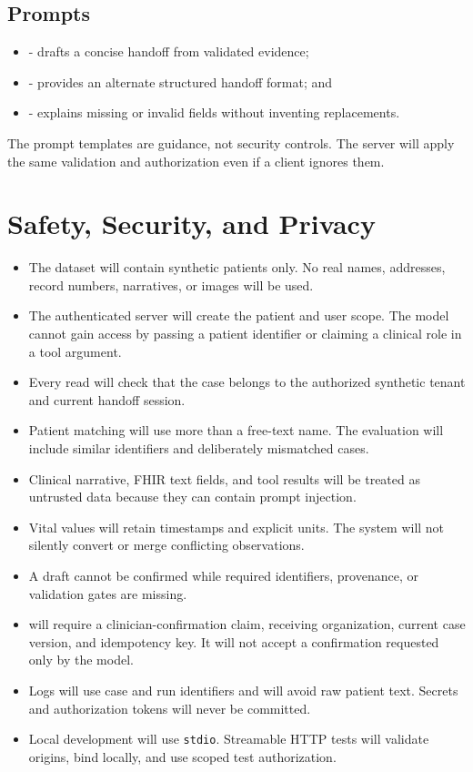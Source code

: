 \documentclass[10pt]{article}
\newcommand{\term}[1]{\texttt{#1}}
\begin{document}
\subsection{Prompts}

\begin{itemize}
  \item {} - drafts a concise handoff from validated evidence;
  \item {} - provides an alternate structured handoff format; and
  \item {} - explains missing or invalid fields without inventing replacements.
\end{itemize}

The prompt templates are guidance, not security controls. The server will apply the same validation and authorization even if a client ignores them.

\section{Safety, Security, and Privacy}

\begin{itemize}
  \item The dataset will contain synthetic patients only. No real names, addresses, record numbers, narratives, or images will be used.
  \item The authenticated server will create the patient and user scope. The model cannot gain access by passing a patient identifier or claiming a clinical role in a tool argument.
  \item Every read will check that the case belongs to the authorized synthetic tenant and current handoff session.
  \item Patient matching will use more than a free-text name. The evaluation will include similar identifiers and deliberately mismatched cases.
  \item Clinical narrative, FHIR text fields, and tool results will be treated as untrusted data because they can contain prompt injection.
  \item Vital values will retain timestamps and explicit units. The system will not silently convert or merge conflicting observations.
  \item A draft cannot be confirmed while required identifiers, provenance, or validation gates are missing.
  \item {} will require a clinician-confirmation claim, receiving organization, current case version, and idempotency key. It will not accept a confirmation requested only by the model.
  \item Logs will use case and run identifiers and will avoid raw patient text. Secrets and authorization tokens will never be committed.
  \item Local development will use \term{stdio}. Streamable HTTP tests will validate origins, bind locally, and use scoped test authorization.
\end{itemize}
\end{document}
